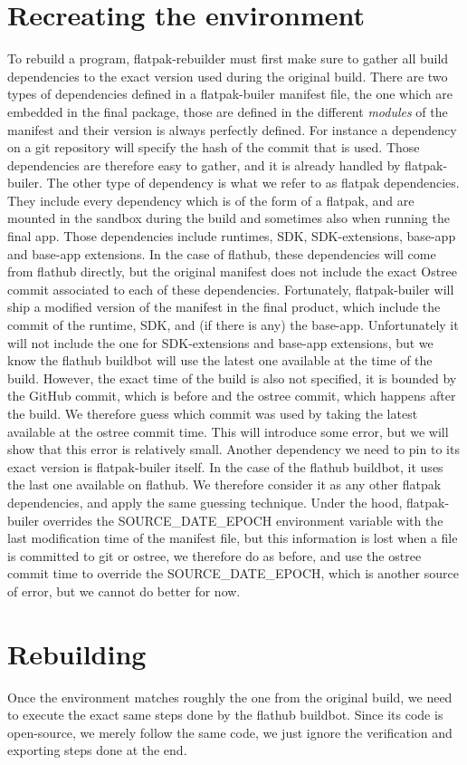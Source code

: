 \documentclass[a4paper,11pt,oneside]{report}
\theoremstyle{definition}
\newcommand{\sysname}{flatpak-rebuilder\xspace}
\newcommand{\fp}{flatpak\xspace}
\newcommand{\fh}{flathub\xspace}
\newcommand{\fb}{flatpak-builer\xspace}
\newcommand{\fdp}{flatpak dependencies\xspace}
\newcommand{\sde}{SOURCE\_DATE\_EPOCH\xspace}
\newcommand{\fhbb}{flathub buildbot\xspace}
\begin{document}
\section{Recreating the environment}
To rebuild a program, \sysname must first make sure to gather all build
dependencies to the exact version used during the original build. There are two
types of dependencies defined in a \fb manifest file, the one which are
embedded in the final package, those are defined in the different
\emph{modules} of the manifest and their version is always perfectly defined.
For instance a dependency on a git repository will specify the hash of the
commit that is used. Those dependencies are therefore easy to gather, and it is
already handled by \fb.
The other type of dependency is what we refer to as \fdp. They include every
dependency which is of the form of a \fp, and are mounted in the sandbox
during the build and sometimes also when running the final app. Those
dependencies include runtimes, SDK, SDK-extensions, base-app and base-app
extensions. In the case of \fh, these dependencies will come from \fh directly,
but the original manifest does not include the exact Ostree commit associated
to each of these dependencies. Fortunately, \fb will ship a modified version of
the manifest in the final product, which include the commit of the runtime,
SDK, and (if there is any) the base-app. Unfortunately it will not include the
one for SDK-extensions and base-app extensions, but we know the \fhbb will use
the latest one available at the time of the build. However, the exact time of
the build is also not specified, it is bounded by the GitHub commit, which is
before and the ostree commit, which happens after the build. We therefore guess
which commit was used by taking the latest available at the ostree commit time.
This will introduce some error, but we will show that this error is relatively
small. Another dependency we need to pin to its exact version is \fb itself. In
the case of the \fhbb, it uses the last one available on \fh. We therefore
consider it as any other \fdp, and apply the same guessing technique.
Under the hood, \fb overrides the \sde environment variable with the last
modification time of the manifest file, but this information is lost when a
file is committed to git or ostree, we therefore do as before, and use the
ostree commit time to override the \sde, which is another source of error, but
we cannot do better for now.

\section{Rebuilding}
Once the environment matches roughly the one from the original build, we need
to execute the exact same steps done by the \fhbb. Since its code is
open-source, we merely follow the same code, we just ignore the verification
and exporting steps done at the end.
\end{document}
